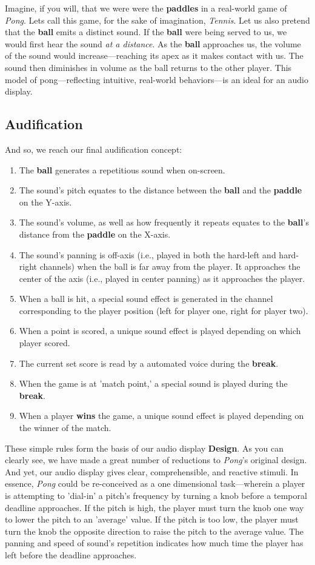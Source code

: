 \documentclass{report}
\newcommand{\design}{\textbf{Design}\xspace}
\newcommand{\state}[1]{\textbf{#1}}
\newcommand{\pad}{\textbf{paddle}\xspace}
\newcommand{\ball}{\textbf{ball}\xspace}
\begin{document}
Imagine, if you will, that we were were the \state{paddles} in a real-world game of \emph{Pong}. Lets call this game, for the sake of imagination, \emph{Tennis}. Let us also pretend that the \ball emits a distinct sound. If the \ball were being served to us, we would first hear the sound \emph{at a distance}. As the \ball approaches us, the volume of the sound would increase---reaching its apex as it makes contact with us. The sound then diminishes in volume as the ball returns to the other player. This model of pong---reflecting intuitive, real-world behaviors---is an ideal for an audio display.

\subsection{Audification}
And so, we reach our final audification concept:

\begin{enumerate}
    \item The \ball generates a repetitious sound when on-screen.
    \item The sound's pitch equates to the distance between the \ball and the \pad on the Y-axis.
    \item The sound's volume, as well as how frequently it repeats equates to the \ball's distance from the \pad on the X-axis.
    \item The sound's panning is off-axis (i.e., played in both the hard-left and hard-right channels) when the ball is far away from the player. It approaches the center of the axis (i.e., played in center panning) as it approaches the player.
    \item When a ball is hit, a special sound effect is generated in the channel corresponding to the player position (left for player one, right for player two).
    \item When a point is scored, a unique sound effect is played depending on which player scored.
    \item The current set score is read by a automated voice during the \state{break}.
    \item When the game is at 'match point,' a special sound is played during the \state{break}.
    \item When a player \state{wins} the game, a unique sound effect is played depending on the winner of the match.
\end{enumerate}

These simple rules form the basis of our audio display \design. As you can clearly see, we have made a great number of reductions to \emph{Pong}'s original design. And yet, our audio display gives clear, comprehensible, and reactive stimuli. In essence, \emph{Pong} could be re-conceived as a one dimensional task---wherein a player is attempting to 'dial-in' a pitch's frequency by turning a knob before a temporal deadline approaches. If the pitch is high, the player must turn the knob one way to lower the pitch to an 'average' value. If the pitch is too low, the player must turn the knob the opposite direction to raise the pitch to the average value. The panning and speed of sound's repetition indicates how much time the player has left before the deadline approaches.
\end{document}
